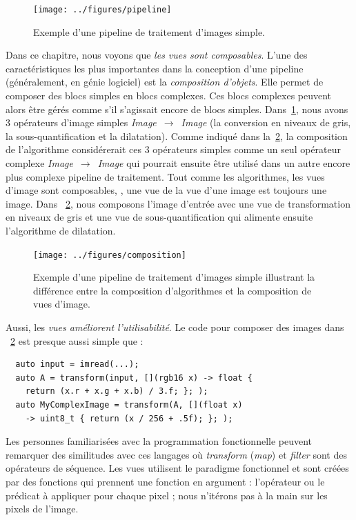 \begin{figure}[htbp]
  \centering
  \texttt{[image: ../figures/pipeline]}
  \caption[]{Exemple d'une pipeline de traitement d'images simple.}
  \label{resume:fig:view.pipeline}
\end{figure}

Dans ce chapitre, nous voyons que \emph{les vues sont composables}. L'une des caractéristiques les plus importantes dans
la conception d'une pipeline (généralement, en génie logiciel) est la \emph{composition d'objets}. Elle permet de
composer des blocs simples en blocs complexes. Ces blocs complexes peuvent alors être gérés comme s'il s'agissait encore
de blocs simples. Dans~\cref{resume:fig:view.pipeline}, nous avons 3 opérateurs d'image simples
\emph{Image}~\(\rightarrow\)~\emph{Image} (la conversion en niveaux de gris, la sous-quantification et la dilatation).
Comme indiqué dans la~\cref{resume:fig:view.comp}, la composition de l'algorithme considérerait ces 3 opérateurs simples
comme un seul opérateur complexe \emph{Image}~\(\rightarrow\)~\emph{Image} qui pourrait ensuite être utilisé dans un
autre encore plus complexe pipeline de traitement. Tout comme les algorithmes, les vues d'image sont composables, \prex,
une vue de la vue d'une image est toujours une image. Dans ~\cref{resume:fig:view.comp}, nous composons l'image d'entrée
avec une vue de transformation en niveaux de gris et une vue de sous-quantification qui alimente ensuite l'algorithme de
dilatation.

\begin{figure}[htbp]
  \centering
  \texttt{[image: ../figures/composition]}
  \caption[]{Exemple d'une pipeline de traitement d'images simple illustrant la différence entre la composition
    d'algorithmes et la composition de vues d'image.}
  \label{resume:fig:view.comp}
\end{figure}

Aussi, les \emph{vues améliorent l'utilisabilité}. Le code pour composer des images dans ~\cref{resume:fig:view.comp}
est presque aussi simple que :

\begin{verbatim}
  auto input = imread(...);
  auto A = transform(input, [](rgb16 x) -> float {
    return (x.r + x.g + x.b) / 3.f; }; );
  auto MyComplexImage = transform(A, [](float x)
    -> uint8_t { return (x / 256 + .5f); }; );
\end{verbatim}

Les personnes familiarisées avec la programmation fonctionnelle peuvent remarquer des similitudes avec ces langages où
\emph{transform} (\emph{map}) et \emph{filter} sont des opérateurs de séquence. Les vues utilisent le paradigme
fonctionnel et sont créées par des fonctions qui prennent une fonction en argument : l'opérateur ou le prédicat à
appliquer pour chaque pixel ; nous n'itérons pas à la main sur les pixels de l'image.

